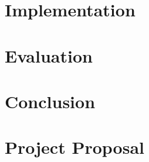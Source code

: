 \documentclass[12pt,a4paper,twoside,openright]{report}
\begin{document}
	\chapter{Implementation}
	
	\chapter{Evaluation}
	
	\chapter{Conclusion}
	
	
	
	
	
	\appendix

	\chapter{Project Proposal}
	
	
	
	
\end{document}
